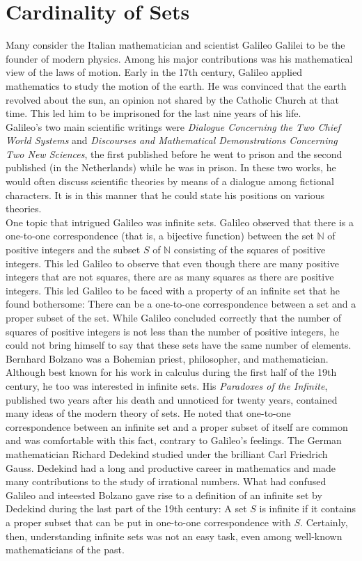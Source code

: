 \documentclass[10pt]{report}
\begin{document}
\chapter{Cardinality of Sets}
Many consider the Italian mathematician and scientist Galileo Galilei to be the founder of modern physics. Among his major contributions was his mathematical view of the laws of motion. Early in the 17th century, Galileo applied mathematics to study the motion of the earth. He was convinced that the earth revolved about the sun, an opinion not shared by the Catholic Church at that time. This led him to be imprisoned for the last nine years of his life.\\
Galileo's two main scientific writings were \textit{Dialogue Concerning the Two Chief World Systems} and \textit{Discourses and Mathematical Demonstrations Concerning Two New Sciences}, the first published before he went to prison and the second published (in the Netherlands) while he was in prison. In these two works, he would often discuss scientific theories by means of a dialogue among fictional characters. It is in this manner that he could state his positions on various theories.\\
One topic that intrigued Galileo was infinite sets. Galileo observed that there is a one-to-one correspondence (that is, a bijective function) between the set $\mathbb{N}$ of positive integers and the subset $S$ of $\mathbb{N}$ consisting of the squares of positive integers. This led Galileo to observe that even though there are many positive integers that are not squares, there are as many squares as there are positive integers. This led Galileo to be faced with a property of an infinite set that he found bothersome: There can be a one-to-one correspondence between a set and a proper subset of the set. While Galileo concluded correctly that the number of squares of positive integers is not less than the number of positive integers, he could not bring himself to say that these sets have the same number of elements.\\
Bernhard Bolzano was a Bohemian priest, philosopher, and mathematician. Although best known for his work in calculus during the first half of the 19th century, he too was interested in infinite sets. His \textit{Paradoxes of the Infinite}, published two years after his death and unnoticed for twenty years, contained many ideas of the modern theory of sets. He noted that one-to-one correspondence between an infinite set and a proper subset of itself are common and was comfortable with this fact, contrary to Galileo's feelings. The German mathematician Richard Dedekind studied under the brilliant Carl Friedrich Gauss. Dedekind had a long and productive career in mathematics and made many contributions to the study of irrational numbers. What had confused Galileo and inteested Bolzano gave rise to a definition of an infinite set by Dedekind during the last part of the 19th century: A set $S$ is infinite if it contains a proper subset that can be put in one-to-one correspondence with $S$. Certainly, then, understanding infinite sets was not an easy task, even among well-known mathematicians of the past.\\
\end{document}
